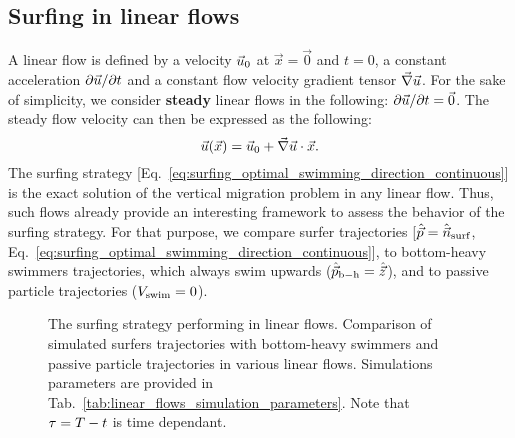 \subsection{Surfing in linear flows}\label{sec:the_surfing_strategy_linear}

A linear flow is defined by a velocity $\vec{u}_0$ at $\vec{x} = \vec{0}$ and $t = 0$, a constant acceleration $\partial \vec{u} / \partial t$ and a constant flow velocity gradient tensor $\vec{\nabla} \vec{u}$.
For the sake of simplicity, we consider \textbf{steady} linear flows in the following: $\partial \vec{u} / \partial t = \vec{0}$.
The steady flow velocity can then be expressed as the following:
\begin{equation}\label{eq:linear_velocity}
	\vec{u}(\vec{x}) = \vec{u}_0 + \vec{\nabla} \vec{u} \cdot \vec{x}.
\end{equation}
The surfing strategy [Eq.~\eqref{eq:surfing_optimal_swimming_direction_continuous}] is the exact solution of the vertical migration problem in any linear flow.
Thus, such flows already provide an interesting framework to assess the behavior of the surfing strategy.
For that purpose, we compare surfer trajectories [$\hat{\vec{p}} = \hat{\vec{n}}_{\mathrm{surf}}$, Eq.~\eqref{eq:surfing_optimal_swimming_direction_continuous}], to bottom-heavy swimmers trajectories, which always swim upwards ($\hat{\vec{p}}_{\mathrm{b-h}} = \hat{\vec{z}}$), and to passive particle trajectories ($V_{\mathrm{swim}} = 0$).
\begin{figure}[p]
	\centering
	
	\caption[The surfing strategy performing in linear flows.]{
		The surfing strategy performing in linear flows.
		Comparison of simulated surfers trajectories with bottom-heavy swimmers and passive particle trajectories in various linear flows.
		Simulations parameters are provided in Tab.~\ref{tab:linear_flows_simulation_parameters}. Note that $\tau = T - t$ is time dependant.
	}
	\label{fig:various_linear_flows}
\end{figure}
